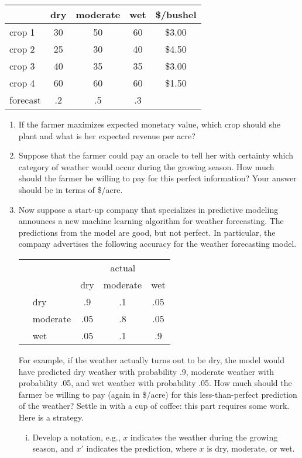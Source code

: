 \begin{enumerate}
\begin{center}
\begin{tabular}{lcccc}
& dry & moderate & wet & \$/bushel \\ \hline
crop 1 & 30 & 50 & 60 & \$3.00 \\
crop 2 & 25 & 30 & 40 & \$4.50 \\
crop 3 & 40 & 35 & 35 & \$3.00 \\
crop 4 & 60 & 60 & 60 & \$1.50 \\ \hline
forecast & .2 & .5 & .3 & 
\end{tabular}
\end{center}

\begin{enumerate}
\item If the farmer maximizes expected monetary value, which crop
should she plant and what is her expected revenue per acre?

\item Suppose that the farmer could pay an oracle to tell her
with certainty which category of weather would occur during
the growing season. How much should the farmer be willing to 
pay for this perfect information? Your answer should be in terms
of \$/acre. \label{b}

\item Now suppose a start-up company that specializes in predictive
  modeling announces a new machine learning algorithm for weather
  forecasting. The predictions from the model are good, but not
  perfect.  In particular, the company advertises the following
  accuracy for the weather forecasting model. \label{c}

\begin{center}
\begin{tabular}{clccc}
& & \multicolumn{3}{c}{actual} \\
& & dry & moderate & wet \\ \cline{2-5}
\parbox[t]{2mm}{} & dry & .9 & .1 & .05 \\
& moderate & .05 & .8 & .05 \\
& wet & .05 & .1 & .9 
\end{tabular}
\end{center}

For example, if the weather actually turns out to be dry, the model
would have predicted dry weather with probability .9, moderate weather
with probability .05, and wet weather with probability .05. How much
should the farmer be willing to pay (again in \$/acre) for this
less-than-perfect prediction of the weather? Settle in with a cup of
coffee: this part requires some work. Here is a strategy.
\begin{enumerate}[i)]
\item Develop a notation, e.g., $x$ indicates the weather during the growing season,
and $x'$ indicates the prediction, where $x$ is dry, moderate, or wet.


\end{enumerate}
\end{enumerate}
\end{enumerate}
